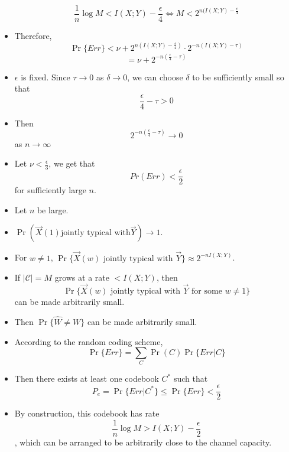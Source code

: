 \documentclass[../main.tex]{subfiles}
\begin{document}
\begin{itemize}
\[    \frac{1}{n}\log M < I(X;Y)-\frac{\epsilon}{4}\iff M < 2^{n(I(X;Y)-\frac{\epsilon}{4}}
    \]
    \item Therefore, \[
    \Pr\{Err\} < \nu + 2^{n(I(X;Y)-\frac{\epsilon}{4})}\cdot 2^{-n(I(X;Y)-\tau)}
    \]
    \[
    =\nu + 2^{-n(\frac{\epsilon}{4}-\tau)}
    \]
    \item $\epsilon$ is fixed. Since $\tau\to 0$ as $\delta \to 0$, we can choose $\delta$ to be sufficiently small so that \[
    \frac{\epsilon}{4}-\tau > 0
    \]
    \item Then \[
    2^{-n(\frac{\epsilon}{4}-\tau)}\to 0
    \] as $n\to \infty$
    \item Let $\nu < \frac{\epsilon}{3}$, we get that \[
    Pr(Err) < \frac{\epsilon}{2}
    \] for sufficiently large $n$.
\end{itemize}
\begin{itemize}
    \item Let $n$ be large.
    \item $\Pr(\vec X(1) \text{jointly typical with} \vec Y) \to 1$.
    \item For $w\neq 1$, $\Pr\{\text{$\vec X(w)$ jointly typical with $\vec Y$}\} \approx 2^{-nI(X;Y)}$.
    \item If $|\mathcal{C}|=M$ grows at a rate $<I(X;Y)$, then \[
    \Pr\{\text{$\vec X(w)$ jointly typical with $\vec Y$ for some $w\neq 1$}\} 
    \] can be made arbitrarily small.
    \item Then $\Pr\{\hat{W}\neq W\}$ can be made arbitrarily small.
\end{itemize}
\begin{itemize}
    \item According to the random coding scheme, \[
    \Pr\{Err\}=\sum_C \Pr(C)\Pr\{Err|C\}
    \]
    \item Then there exists at least one codebook $C^*$ such that \[
    P_e=\Pr\{Err|C^*\}\leq \Pr\{Err\} < \frac{\epsilon}{2}
    \]
    \item By construction, this codebook has rate \[
    \frac{1}{n}\log M > I(X;Y)-\frac{\epsilon}{2}
    \], which can be arranged to be arbitrarily close to the channel capacity.
\end{itemize}
\end{document}
